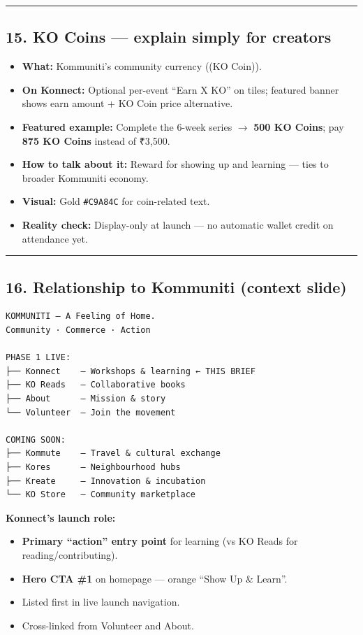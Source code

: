\documentclass[11pt,a4paper]{report}
\begin{document}
\medskip\hrule\medskip

\subsection{15. KO Coins --- explain simply for creators}

\begin{itemize}
  \item \textbf{What:} Kommuniti’s community currency ((KO Coin)).
  \item \textbf{On Konnect:} Optional per-event “Earn X KO” on tiles; featured banner shows earn amount + KO Coin price alternative.
  \item \textbf{Featured example:} Complete the 6-week series $\rightarrow$ \textbf{500 KO Coins}; pay \textbf{875 KO Coins} instead of ₹3,500.
  \item \textbf{How to talk about it:} Reward for showing up and learning --- ties to broader Kommuniti economy.
  \item \textbf{Visual:} Gold \texttt{\#C9A84C} for coin-related text.
  \item \textbf{Reality check:} Display-only at launch --- no automatic wallet credit on attendance yet.
\end{itemize}

\medskip\hrule\medskip

\subsection{16. Relationship to Kommuniti (context slide)}

\begin{verbatim}
KOMMUNITI — A Feeling of Home.
Community · Commerce · Action

PHASE 1 LIVE:
├── Konnect    — Workshops & learning ← THIS BRIEF
├── KO Reads   — Collaborative books
├── About      — Mission & story
└── Volunteer  — Join the movement

COMING SOON:
├── Kommute    — Travel & cultural exchange
├── Kores      — Neighbourhood hubs
├── Kreate     — Innovation & incubation
└── KO Store   — Community marketplace
\end{verbatim}

\textbf{Konnect’s launch role:}

\begin{itemize}
  \item \textbf{Primary “action” entry point} for learning (vs KO Reads for reading/contributing).
  \item \textbf{Hero CTA \#1} on homepage --- orange “Show Up \& Learn”.
  \item Listed first in live launch navigation.
  \item Cross-linked from Volunteer and About.
\end{itemize}
\end{document}
